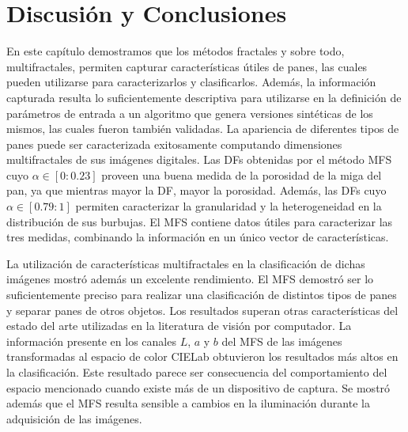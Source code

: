 
\section{Discusión y Conclusiones}

En este capítulo demostramos que los métodos fractales y sobre todo, multifractales, permiten capturar características útiles de panes, las cuales pueden utilizarse para caracterizarlos y clasificarlos.
Además, la información capturada resulta lo suficientemente descriptiva para utilizarse en la definición de parámetros de entrada a un algoritmo que genera versiones sintéticas de los mismos, las cuales fueron también validadas.
La apariencia de diferentes tipos de panes puede ser caracterizada exitosamente computando dimensiones multifractales de sus imágenes digitales.
Las DFs obtenidas por el método MFS cuyo $\alpha \in [0: 0.23]$ proveen una buena medida de la porosidad de la miga del pan, ya que mientras mayor la DF, mayor la porosidad.
Además, las DFs cuyo $\alpha \in [0.79: 1]$ permiten caracterizar la granularidad y la heterogeneidad en la distribución de sus burbujas.
El MFS contiene datos útiles para caracterizar las tres medidas, combinando la información en un único vector de características.

La utilización de características multifractales en la clasificación de dichas imágenes mostró además un excelente rendimiento.
El MFS demostró ser lo suficientemente preciso para realizar una clasificación de distintos tipos de panes y separar panes de otros objetos.
Los resultados superan otras características del estado del arte utilizadas en la literatura de visión por computador.
La información presente en los canales $L$, $a$ y $b$ del MFS de las imágenes transformadas al espacio de color CIELab obtuvieron los resultados más altos en la clasificación.
Este resultado parece ser consecuencia del comportamiento del espacio mencionado cuando existe más de un dispositivo de captura.
Se mostró además que el MFS resulta sensible a cambios en la iluminación durante la adquisición de las imágenes.

